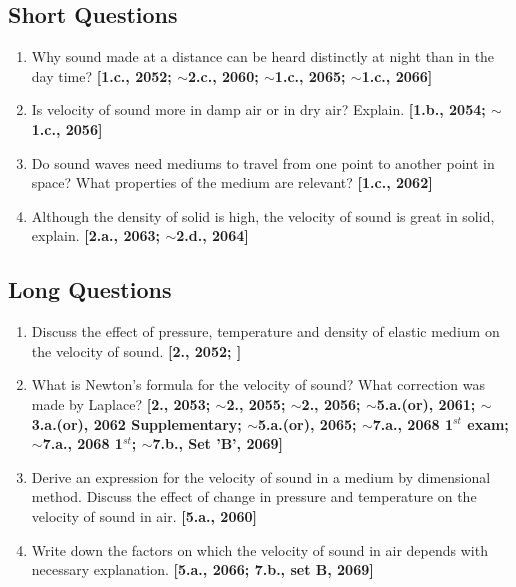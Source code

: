 \documentclass[a4paper,10pt]{report}
\begin{document}
 \subsection{Short Questions}
  \begin{enumerate}
   \item Why sound made at a distance can be heard distinctly at night than in the day time? 
    \textbf{[1.c., 2052; $\sim$2.c., 2060; $\sim$1.c., 2065; $\sim$1.c., 2066]}
   \item Is velocity of sound more in damp air or in dry air? Explain. \textbf{[1.b., 2054; $\sim$1.c., 2056]}
   \item Do sound waves need mediums to travel from one point to another point in space? What properties of the
    medium are relevant? \textbf{[1.c., 2062]}
   \item Although the density of solid is high, the velocity of sound is great in solid, explain. 
    \textbf{[2.a., 2063; $\sim$2.d., 2064]}
  \end{enumerate}

 \subsection{Long Questions}
  \begin{enumerate}
   \item Discuss the effect of pressure, temperature and density of elastic medium on the velocity of sound. 
    \textbf{[2., 2052; ]}
   \item What is Newton's formula for the velocity of sound? What correction was made by Laplace? 
    \textbf{[2., 2053; $\sim$2., 2055; $\sim$2., 2056; $\sim$5.a.(or), 2061; $\sim$3.a.(or), 2062 Supplementary;
     $\sim$5.a.(or), 2065; $\sim$7.a., 2068 1$^{st}$ exam; $\sim$7.a., 2068 1$^{st}$; $\sim$7.b., Set 'B', 2069]}
   \item Derive an expression for the velocity of sound in a medium by dimensional method. Discuss the
    effect of change in pressure and temperature on the velocity of sound in air. \textbf{[5.a., 2060]}
   \item Write down the factors on which the velocity of sound in air depends with necessary explanation. 
    \textbf{[5.a., 2066; 7.b., set B, 2069]}
  \end{enumerate}
  
\end{document}
